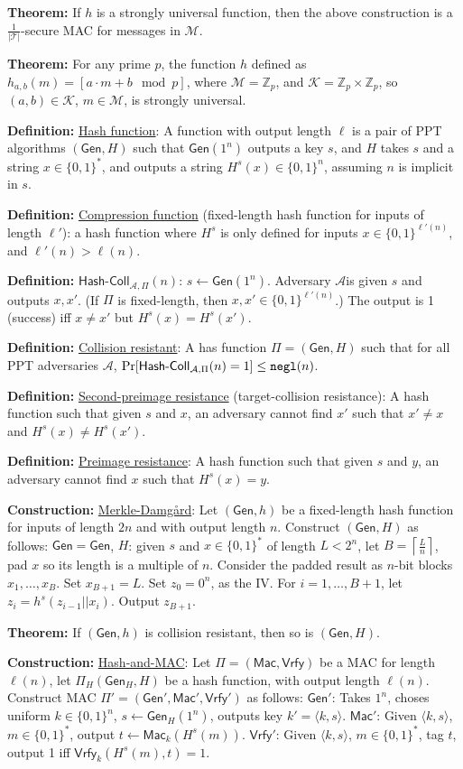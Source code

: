 \documentclass[10pt]{article}
\newcommand{\Z}{\mathbb{Z}}
\newcommand{\AAA}{\mathcal{A}}
\newcommand{\KKK}{\mathcal{K}}
\newcommand{\MMM}{\mathcal{M}}
\newcommand{\TTT}{\mathcal{T}}
\newcommand{\defn}[1]{{\bf Definition:} \underline{#1}}
\newcommand{\thm}[1]{{\bf Theorem:} \underline{#1}}
\newcommand{\con}[1]{{\bf Construction:} \underline{#1}}
\newcommand{\Mac}{\mathsf{Mac}}
\newcommand{\Vrfy}{\mathsf{Vrfy}}
\newcommand{\Gen}{\mathsf{Gen}}
\newcommand{\ang}[1]{\langle#1\rangle}
\newcommand{\ExptHCArgs}[2]{\mathsf{Hash\text{-}Coll}_{#1,#2}}
\newcommand{\ExptHC}{\ExptHCArgs{\AAA}{\Pi}}
\newcommand{\negl}{{\tt negl}}
\newcommand{\from}{\leftarrow}
\begin{document}
\begin{multicols}{4}
\thm{}If $h$ is a strongly universal function, then the above construction is a $\frac{1}{|\TTT|}$-secure MAC for messages in $\MMM$.

\thm{}For any prime $p$, the function $h$ defined as $h_{a,b}(m)=[a\cdot m+b\mod{p}]$, where $\MMM=\Z_p$, and $\KKK=\Z_p\times\Z_p$, so $(a,b)\in\KKK$, $m\in\MMM$, is strongly universal.

\defn{Hash function}: A function with output length $\ell$ is a pair of PPT algorithms $(\Gen, H)$ such that $\Gen(1^n)$ outputs a key $s$, and $H$ takes $s$ and a string $x\in\{0,1\}^*$, and outputs a string $H^s(x)\in\{0,1\}^n$, assuming $n$ is implicit in $s$.

\defn{Compression function} (fixed-length hash function for inputs of length $\ell'$): a hash function where $H^s$ is only defined for inputs $x\in\{0,1\}^{\ell'(n)}$, and $\ell'(n)>\ell(n)$.

\defn{$\ExptHC(n)$}: $s\from\Gen(1^n)$. Adversary $\AAA$is given $s$ and outputs $x,x'$. (If $\Pi$ is fixed-length, then $x,x'\in\{0,1\}^{\ell'(n)}$.) The output is 1 (success) iff $x\neq x'$ but $H^s(x)=H^s(x')$.

\defn{Collision resistant}: A has function $\Pi=(\Gen, H)$ such that for all PPT adversaries $\AAA$, $\Pr[\ExptHC(n)=1]\leq\negl(n)$.

\defn{Second-preimage resistance} (target-collision resistance): A hash function such that given $s$ and $x$, an adversary cannot find $x'$ such that $x'\neq x$ and $H^s(x)\neq H^s(x')$.

\defn{Preimage resistance}: A hash function such that given $s$ and $y$, an adversary cannot find $x$ such that $H^s(x)=y$.

\con{Merkle-Damg\r{a}rd}: Let $(\Gen, h)$ be a fixed-length hash function for inputs of length $2n$ and with output length $n$. Construct $(\Gen, H)$ as follows: $\Gen=\Gen$, $H$: given $s$ and $x\in\{0,1\}^*$ of length $L<2^n$, let $B=\left\lceil\frac{L}{n}\right\rceil$, pad $x$ so its length is a multiple of $n$. Consider the padded result as $n$-bit blocks $x_1, \dots,x_B$. Set $x_{B+1}=L$. Set $z_0=0^n$, as the IV. For $i=1,\dots,B+1$, let $z_i=h^s(z_{i-1}||x_i)$. Output $z_{B+1}$.

\thm{}If $(\Gen, h)$ is collision resistant, then so is $(\Gen, H)$.

\con{Hash-and-MAC}: Let $\Pi=(\Mac,\Vrfy)$ be a MAC for length $\ell(n)$, let $\Pi_{H}(\Gen_H,H)$ be a hash function, with output length $\ell(n)$. Construct MAC $\Pi'=(\Gen',\Mac',\Vrfy')$ as follows: $\Gen'$: Takes $1^n$, choses uniform $k\in\{0,1\}^n$, $s\from\Gen_H(1^n)$, outputs key $k'=\ang{k,s}$. $\Mac'$: Given $\ang{k,s}$, $m\in\{0,1\}^*$, output $t\from\Mac_k(H^s(m))$. $\Vrfy'$: Given $\ang{k,s}$, $m\in\{0,1\}^*$, tag $t$, output 1 iff $\Vrfy_k(H^s(m),t)=1$.


\end{multicols}
\end{document}
